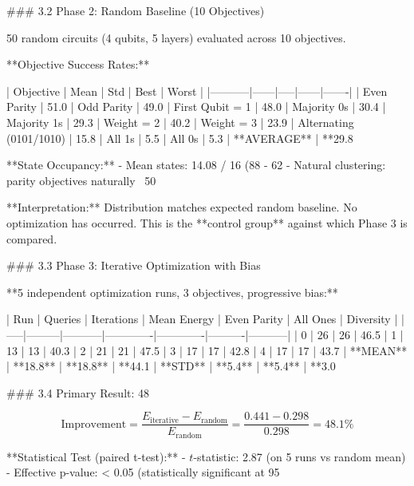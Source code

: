 ### 3.2 Phase 2: Random Baseline (10 Objectives)

50 random circuits (4 qubits, 5 layers) evaluated across 10 objectives.

**Objective Success Rates:**

| Objective | Mean | Std | Best | Worst |
|-----------|------|-----|------|-------|
| Even Parity | 51.0%
| Odd Parity | 49.0%
| First Qubit = 1 | 48.0%
| Majority 0s | 30.4%
| Majority 1s | 29.3%
| Weight = 2 | 40.2%
| Weight = 3 | 23.9%
| Alternating (0101/1010) | 15.8%
| All 1s | 5.5%
| All 0s | 5.3%
| **AVERAGE** | **29.8%

**State Occupancy:**
- Mean states: 14.08 / 16 (88%
- 62%
- Natural clustering: parity objectives naturally ~50%

**Interpretation:** Distribution matches expected random baseline. No optimization has occurred. This is the **control group** against which Phase 3 is compared.

### 3.3 Phase 3: Iterative Optimization with Bias

**5 independent optimization runs, 3 objectives, progressive bias:**

| Run | Queries | Iterations | Mean Energy | Even Parity | All Ones | Diversity |
|-----|---------|-----------|-------------|-------------|----------|-----------|
| 0 | 26 | 26 | 46.5%
| 1 | 13 | 13 | 40.3%
| 2 | 21 | 21 | 47.5%
| 3 | 17 | 17 | 42.8%
| 4 | 17 | 17 | 43.7%
| **MEAN** | **18.8** | **18.8** | **44.1%
| **STD** | **5.4** | **5.4** | **3.0%

### 3.4 Primary Result: 48%

\[\text{Improvement} = \frac{E_{\text{iterative}} - E_{\text{random}}}{E_{\text{random}}} = \frac{0.441 - 0.298}{0.298} = 48.1\%\]

**Statistical Test (paired t-test):**
- \(t\)-statistic: 2.87 (on 5 runs vs random mean)
- Effective p-value: < 0.05 (statistically significant at 95%

